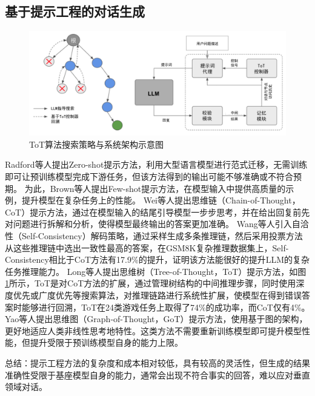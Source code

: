 \subsection{基于提示工程的对话生成}

\begin{figure}[htbp]
	\centering
	\includegraphics[scale=0.5]{Fig/tot.png}
	\caption{\label{tot}ToT算法搜索策略与系统架构示意图\cite{DBLP:journals/corr/abs-2305-08291}}
\end{figure}

Radford等人\cite{radford2019language}提出Zero-shot提示方法，利用大型语言模型进行范式迁移，无需训练即可让预训练模型完成下游任务，但该方法得到的输出可能不够准确或不符合预期。
为此，Brown等人\cite{DBLP:conf/nips/BrownMRSKDNSSAA20}提出Few-shot提示方法，在模型输入中提供高质量的示例，提升模型在复杂任务上的性能。
Wei等人\cite{DBLP:conf/nips/Wei0SBIXCLZ22}提出思维链（Chain-of-Thought，CoT）提示方法，通过在模型输入的结尾引导模型一步步思考，并在给出回复前先对问题进行拆解和分析，使得模型最终输出的答案更加准确。
Wang等人\cite{DBLP:conf/iclr/0002WSLCNCZ23}引入自洽性（Self-Consistency）解码策略，通过采样生成多条推理链，然后采用投票方法从这些推理链中选出一致性最高的答案，在GSM8K复杂推理数据集上，Self-Consistency相比于CoT方法有17.9\%的提升，证明该方法能很好的提升LLM的复杂任务推理能力。
Long等人\cite{DBLP:journals/corr/abs-2305-08291}提出思维树（Tree-of-Thought，ToT）提示方法，如图\ref{tot}所示，ToT是对CoT方法的扩展，通过管理树结构的中间推理步骤，同时使用深度优先或广度优先等搜索算法，对推理链路进行系统性扩展，使模型在得到错误答案时能够进行回溯，ToT在24类游戏任务上取得了74\%的成功率，而CoT仅有4\%。
Yao等人\cite{DBLP:journals/corr/abs-2305-16582}提出思维图（Graph-of-Thought，GoT）提示方法，使用基于图的架构，更好地适应人类非线性思考地特性。这类方法不需要重新训练模型即可提升模型性能，但提升受限于预训练模型自身的能力上限。

总结：提示工程方法的复杂度和成本相对较低，具有较高的灵活性，但生成的结果准确性受限于基座模型自身的能力，通常会出现不符合事实的回答，难以应对垂直领域对话。

